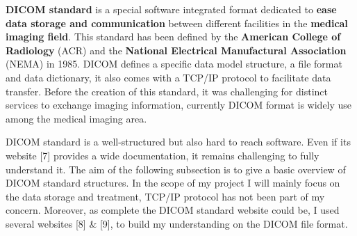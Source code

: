 \textbf{DICOM standard} is a special software integrated format dedicated to \textbf{ease data storage and communication} between different facilities in the \textbf{medical imaging field}. This standard has been defined by the \textbf{American College of Radiology} (ACR) and the \textbf{National Electrical Manufactural Association} (NEMA) in 1985. DICOM defines a specific data model structure, a file format and data dictionary, it also comes with a TCP/IP protocol to facilitate data transfer. Before the creation of this standard, it was challenging for distinct services to exchange imaging information, currently DICOM format is widely use among the medical imaging area. 

\newline \vspace{5mm}
DICOM standard is a well-structured but also hard to reach software. Even if its website [7] provides a wide documentation, it remains challenging to fully understand it. The aim of the following subsection is to give a basic overview of DICOM standard structures. In the scope of my project I will mainly focus on the data storage and treatment, TCP/IP protocol has not been part of my concern. Moreover, as complete the DICOM standard website could be, I used several websites [8] \& [9], to build my understanding on the DICOM file format. 



